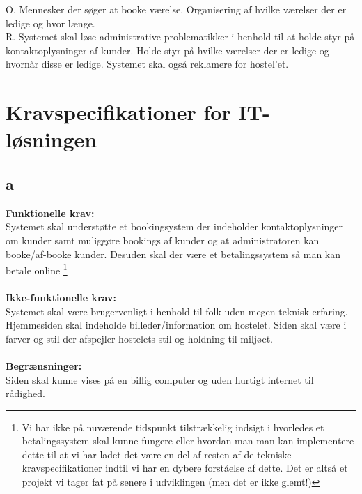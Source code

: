 \documentclass[12pt,a4paper]{article}
\begin{document}
O. Mennesker der søger at booke værelse. Organisering af hvilke værelser der er ledige og hvor længe.\\

R. Systemet skal løse administrative problematikker i henhold til at holde styr på kontaktoplysninger af kunder. Holde styr på hvilke værelser der er ledige og hvornår disse er ledige. Systemet skal også reklamere for hostel'et.\\
\newpage
\section{Kravspecifikationer for IT-løsningen}
\subsection{a}
\textbf{Funktionelle krav:} \\
	Systemet skal understøtte et bookingsystem der indeholder kontaktoplysninger om kunder 	samt muliggøre bookings af kunder og at administratoren kan booke/af-booke kunder. Desuden skal der være et betalingssystem så man kan betale online \footnote{Vi har ikke på nuværende tidspunkt tilstrækkelig indsigt i hvorledes et betalingssystem skal kunne fungere eller hvordan man man kan implementere dette til at vi har ladet det være en del af resten af de tekniske kravspecifikationer indtil vi har en dybere forståelse af dette. Det er altså et projekt vi tager fat på senere i udviklingen (men det er ikke glemt!)  } \\ \hfill \\
       \textbf{Ikke-funktionelle krav:} \\
	Systemet skal være brugervenligt i henhold til folk uden megen teknisk erfaring. 	Hjemmesiden skal indeholde billeder/information om hostelet. Siden skal være i farver og 	stil der afspejler hostelets stil og holdning til miljøet. \\ \hfill \\
      \textbf{Begrænsninger:} \\
	Siden skal kunne vises på en billig computer og uden hurtigt internet til rådighed.
\end{document}
